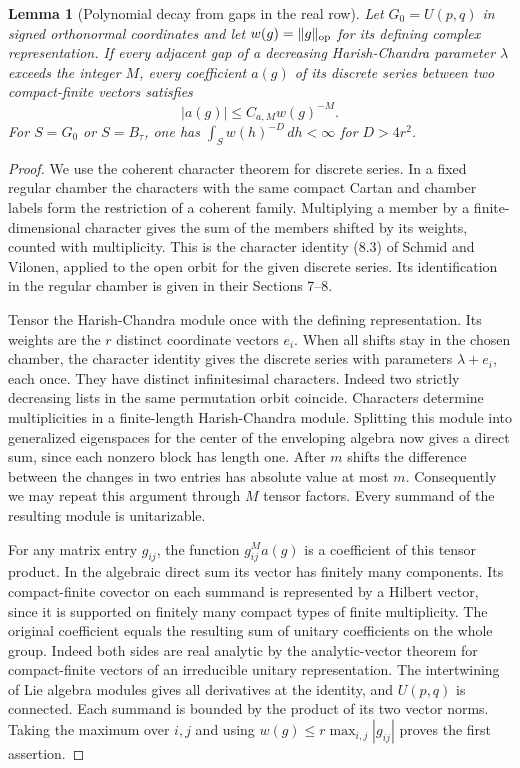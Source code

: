 \documentclass[a4paper,11pt]{article}
\newtheorem{lemma}[proposition]{Lemma}
\theoremstyle{definition}
\theoremstyle{remark}
\numberwithin{equation}{section}
\begin{document}
\begin{lemma}[Polynomial decay from gaps in the real row]
\label{lem:translate163}
Let \(G_0=U(p,q)\) in signed orthonormal coordinates and let
\(w(g)=\|g\|_{\rm op}\) for its defining complex representation.
If every adjacent gap of a decreasing Harish-Chandra parameter
\(\lambda\) exceeds the integer \(M\), every coefficient \(a(g)\)
of its discrete series between two compact-finite vectors satisfies
\[
                  |a(g)|\le C_{a,M} w(g)^{-M}.
\]
For \(S=G_0\) or \(S=B_\tau\), one has
\(\int_S w(h)^{-D}\,dh<\infty\) for \(D>4r^2\).
\end{lemma}
\begin{proof}
We use the coherent character theorem for discrete series. In
a fixed regular chamber the characters with the same compact
Cartan and chamber labels form the restriction of a coherent
family. Multiplying a member by a finite-dimensional character
gives the sum of the members shifted by its weights, counted
with multiplicity. This is the character identity (8.3) of
Schmid and Vilonen, applied to the open orbit for the given
discrete series. Its identification in the regular chamber is
given in their Sections 7--8.~\cite{XVII-XII-IV-sv163}

Tensor the Harish-Chandra module once with the defining
representation. Its weights are the \(r\) distinct coordinate
vectors \(e_i\). When all shifts stay in the chosen chamber,
the character identity gives the discrete series with parameters
\(\lambda+e_i\), each once. They have distinct infinitesimal
characters. Indeed two strictly decreasing lists in the same
permutation orbit coincide. Characters determine multiplicities
in a finite-length Harish-Chandra module. Splitting this module
into generalized eigenspaces for the center of the enveloping
algebra now gives a direct sum, since each nonzero block has
length one. After \(m\) shifts the difference between the
changes in two entries has absolute value at most \(m\).
Consequently we may repeat this argument through \(M\) tensor
factors. Every summand of the resulting module is unitarizable.

For any matrix entry \(g_{ij}\), the function
\(g_{ij}^{M}a(g)\) is a coefficient of this tensor product.
In the algebraic direct sum its vector has finitely many
components. Its compact-finite covector on each summand is
represented by a Hilbert vector, since it is supported on
finitely many compact types of finite multiplicity. The
original coefficient equals the resulting sum of unitary
coefficients on the whole group. Indeed both sides are real
analytic by the analytic-vector theorem for compact-finite
vectors of an irreducible unitary representation. The
intertwining of Lie algebra modules gives all derivatives
at the identity, and \(U(p,q)\) is connected. Each summand
is bounded by the product of its two vector norms. Taking
the maximum over \(i,j\) and using
\(w(g)\le r\max_{i,j}|g_{ij}|\) proves the first assertion.


\end{proof}
\end{document}
